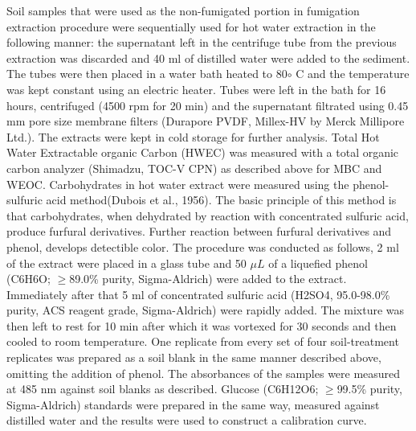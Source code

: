 \documentclass[12pt]{report}
\begin{document}
		Soil samples that were used as the non-fumigated portion in fumigation extraction procedure were sequentially used for hot water extraction in the following manner: the supernatant left in the centrifuge tube from the previous extraction was discarded and 40 ml of distilled water were added to the sediment. The tubes were then placed in a water bath heated to 80$\circ$ C and the temperature was kept constant using an electric heater. Tubes were left in the bath for 16 hours, centrifuged (4500 rpm for 20 min) and the supernatant filtrated using 0.45 mm pore size membrane filters (Durapore PVDF, Millex-HV by Merck Millipore Ltd.). The extracts were kept in cold storage for further analysis.
		Total Hot Water Extractable organic Carbon (HWEC) was measured with a  total organic carbon analyzer (Shimadzu, TOC-V CPN) as described above for MBC and WEOC.
		Carbohydrates in hot water extract were measured using the phenol-sulfuric acid method(Dubois et al., 1956). The basic principle of this method is that carbohydrates, when dehydrated by reaction with concentrated sulfuric acid, produce furfural derivatives. Further reaction between furfural derivatives and phenol, develops detectible color. The procedure was conducted as follows, 2 ml of the extract were placed in a glass tube and 50 $ \mu L $ of a liquefied phenol (C6H6O; $ \geq $89.0\% purity, Sigma-Aldrich) were added to the extract. Immediately after that 5 ml of concentrated sulfuric acid (H2SO4, 95.0-98.0\% purity, ACS reagent grade, Sigma-Aldrich) were rapidly added. The mixture was then left to rest for 10 min after which it was vortexed for 30 seconds and then cooled to room temperature. One replicate from every set of four soil-treatment replicates was prepared as a soil blank in the same manner described above, omitting the addition of phenol. The absorbances of the samples were measured at 485 nm against soil blanks as described. Glucose (C6H12O6; $ \geq $99.5\% purity, Sigma-Aldrich) standards were prepared in the same way, measured against distilled water and the results were used to construct a calibration curve.
		
		
\end{document}
